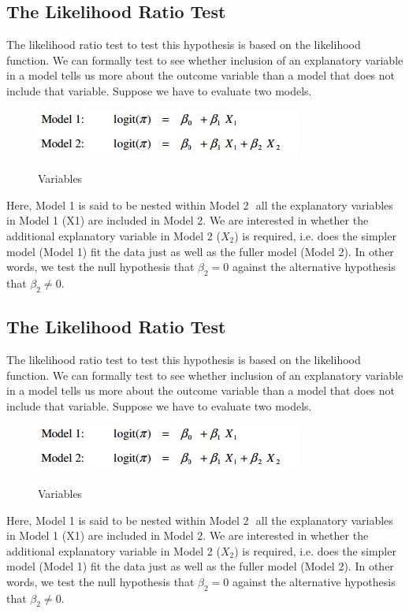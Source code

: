 ﻿\documentclass[a4paper,12pt]{article}
\begin{document}
\subsection{The Likelihood Ratio Test}
The likelihood ratio test to test this hypothesis is based on the likelihood
function. We can formally test to see whether inclusion of an explanatory variable in a model tells us
more about the outcome variable than a model that does not include that variable. Suppose
we have to evaluate two models. 
\begin{center}
	\begin{figure}[h!]
		\includegraphics[scale=0.75]{LogWeek10D}\\
		\caption{Variables}
	\end{figure}
\end{center}
Here, Model 1 is said to be nested within Model 2  all the explanatory variables in Model 1
(X1) are included in Model 2. We are interested in whether the additional explanatory
variable in Model 2 ($X_2$) is required, i.e. does the simpler model (Model 1) fit the data just as
well as the fuller model (Model 2). In other words, we test the null hypothesis that $\beta_2 = 0$
against the alternative hypothesis that $\beta_2 \neq 0$. 



\subsection{The Likelihood Ratio Test}
The likelihood ratio test to test this hypothesis is based on the likelihood
function. We can formally test to see whether inclusion of an explanatory variable in a model tells us
more about the outcome variable than a model that does not include that variable. Suppose
we have to evaluate two models. 
\begin{center}
	\begin{figure}[h!]
		\includegraphics[scale=0.75]{LogWeek10D}\\
		\caption{Variables}
	\end{figure}
\end{center}
Here, Model 1 is said to be nested within Model 2  all the explanatory variables in Model 1
(X1) are included in Model 2. We are interested in whether the additional explanatory
variable in Model 2 ($X_2$) is required, i.e. does the simpler model (Model 1) fit the data just as
well as the fuller model (Model 2). In other words, we test the null hypothesis that $\beta_2 = 0$
against the alternative hypothesis that $\beta_2 \neq 0$. 
\end{document}
